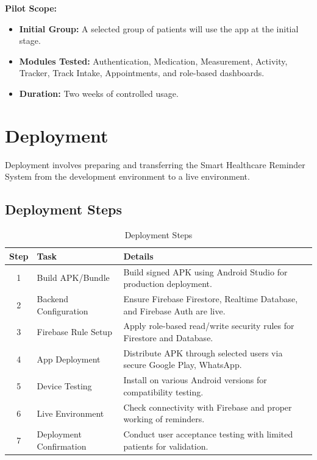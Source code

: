\documentclass[12pt, a4paper, oneside]{report}
\begin{document}
\textbf{Pilot Scope:}
\begin{itemize}
    \item \textbf{Initial Group:} A selected group of patients will use the app at the initial stage.
    \item \textbf{Modules Tested:} Authentication, Medication, Measurement, Activity, Tracker, Track Intake, Appointments, and role-based dashboards.
    \item \textbf{Duration:} Two weeks of controlled usage.
\end{itemize}

\section{Deployment}

Deployment involves preparing and transferring the Smart Healthcare Reminder System from the development environment to a live environment.

\subsection{Deployment Steps}

\begin{table}[H]
\centering
\caption{Deployment Steps}
\begin{tabularx}{\textwidth}{|c|l|X|}
\hline
\textbf{Step} & \textbf{Task} & \textbf{Details} \\ \hline
1 & Build APK/Bundle & Build signed APK using Android Studio for production deployment. \\ \hline
2 & Backend Configuration & Ensure Firebase Firestore, Realtime Database, and Firebase Auth are live. \\ \hline
3 & Firebase Rule Setup & Apply role-based read/write security rules for Firestore and Database. \\ \hline
4 & App Deployment & Distribute APK through selected users via secure Google Play, WhatsApp. \\ \hline
5 & Device Testing & Install on various Android versions for compatibility testing. \\ \hline
6 & Live Environment & Check connectivity with Firebase and proper working of reminders. \\ \hline
7 & Deployment Confirmation & Conduct user acceptance testing with limited patients for validation. \\ \hline
\end{tabularx}
\end{table}
\end{document}
